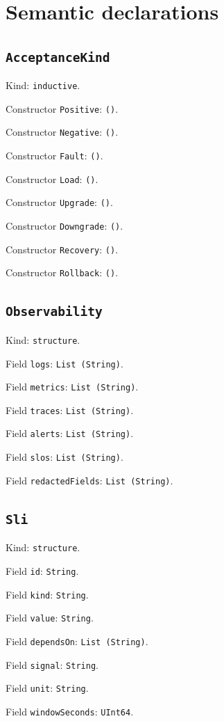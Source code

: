 \documentclass[11pt]{article}
\begin{document}
\section*{Semantic declarations}
\subsection*{\texttt{AcceptanceKind}}
\noindent Kind: \texttt{inductive}.\par
\noindent Constructor \texttt{Positive}: \texttt{()}.\par
\noindent Constructor \texttt{Negative}: \texttt{()}.\par
\noindent Constructor \texttt{Fault}: \texttt{()}.\par
\noindent Constructor \texttt{Load}: \texttt{()}.\par
\noindent Constructor \texttt{Upgrade}: \texttt{()}.\par
\noindent Constructor \texttt{Downgrade}: \texttt{()}.\par
\noindent Constructor \texttt{Recovery}: \texttt{()}.\par
\noindent Constructor \texttt{Rollback}: \texttt{()}.\par
\subsection*{\texttt{Observability}}
\noindent Kind: \texttt{structure}.\par
\noindent Field \texttt{logs}: \texttt{List (String)}.\par
\noindent Field \texttt{metrics}: \texttt{List (String)}.\par
\noindent Field \texttt{traces}: \texttt{List (String)}.\par
\noindent Field \texttt{alerts}: \texttt{List (String)}.\par
\noindent Field \texttt{slos}: \texttt{List (String)}.\par
\noindent Field \texttt{redactedFields}: \texttt{List (String)}.\par
\subsection*{\texttt{Sli}}
\noindent Kind: \texttt{structure}.\par
\noindent Field \texttt{id}: \texttt{String}.\par
\noindent Field \texttt{kind}: \texttt{String}.\par
\noindent Field \texttt{value}: \texttt{String}.\par
\noindent Field \texttt{dependsOn}: \texttt{List (String)}.\par
\noindent Field \texttt{signal}: \texttt{String}.\par
\noindent Field \texttt{unit}: \texttt{String}.\par
\noindent Field \texttt{windowSeconds}: \texttt{UInt64}.\par
\end{document}
